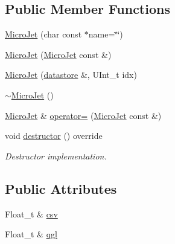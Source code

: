 \subsection*{Public Member Functions}
\begin{DoxyCompactItemize}
\item 
\hyperlink{classpanda_1_1MicroJet_a1abdfc0209789587820ecd057a7a36e4}{MicroJet} (char const $\ast$name=\char`\"{}\char`\"{})
\item 
\hyperlink{classpanda_1_1MicroJet_a9027aa20ca61362ba328071c95925888}{MicroJet} (\hyperlink{classpanda_1_1MicroJet}{MicroJet} const \&)
\item 
\hyperlink{classpanda_1_1MicroJet_abe4a87ea87f3975a2feee775051cf0d6}{MicroJet} (\hyperlink{structpanda_1_1Element_1_1datastore}{datastore} \&, UInt\_\-t idx)
\item 
\hyperlink{classpanda_1_1MicroJet_abe6a12070108df200cb5f8011fc8bbca}{$\sim$MicroJet} ()
\item 
\hyperlink{classpanda_1_1MicroJet}{MicroJet} \& \hyperlink{classpanda_1_1MicroJet_a9375dd6d13362ae323e9915b529458e8}{operator=} (\hyperlink{classpanda_1_1MicroJet}{MicroJet} const \&)
\item 
void \hyperlink{classpanda_1_1MicroJet_a89f2dbacfc1c34c4f34185ea305f8797}{destructor} () override
\begin{DoxyCompactList}\small\item\em Destructor implementation. \item\end{DoxyCompactList}\end{DoxyCompactItemize}
\subsection*{Public Attributes}
\begin{DoxyCompactItemize}
\item 
Float\_\-t \& \hyperlink{classpanda_1_1MicroJet_ae32a258d87814bab374481de01985cd0}{csv}
\item 
Float\_\-t \& \hyperlink{classpanda_1_1MicroJet_a304908e12a2567603ad7cb09c86205b4}{qgl}
\end{DoxyCompactItemize}

